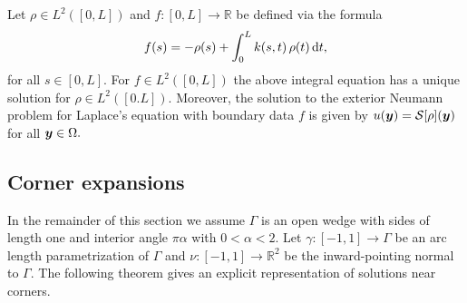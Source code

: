 \begin{theorem}
Let $\rho \in L^2([0,L])$ and $f: [0,L] \rightarrow \mathbb{R}$ be defined via the formula
\begin{align}
f(s)= -\rho(s)+ \int_0^L k(s,t)\,\rho(t)\,{\rm d}t,
\end{align}
for all $s \in [0,L].$ For $f \in L^2([0,L])$ the above integral equation has a unique solution for $\rho \in L^2([0.L]).$ Moreover, the solution to the exterior Neumann problem for Laplace's equation with boundary data $f$ is given by $u(\boldsymbol{y}) = \mathcal{S}[\rho](\boldsymbol{y})$ for all $\boldsymbol{y} \in \Omega.$
\end{theorem}

\subsection{Corner expansions}

In the remainder of this section we assume $\Gamma$ is an open wedge with sides of length one and interior angle $\pi \alpha$ with $0 <\alpha<2.$ Let $\gamma:[-1,1] \rightarrow \Gamma$ be an arc length parametrization of $\Gamma$ and $\nu:[-1,1] \rightarrow \mathbb{R}^2$ be the inward-pointing normal to $\Gamma.$ 
The following theorem  gives an explicit representation of solutions near corners.

